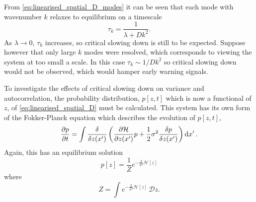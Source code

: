 From \cref{eq:linearised_spatial_D_modes} it can be seen that each mode with wavenumber $k$ relaxes to equilibrium on a timescale
\begin{equation}
  \label{eq:equilirium_timescale}
  \tau_k = \frac{1}{\lambda + Dk^2}.
\end{equation}
As $\lambda \rightarrow 0$, $\tau_k$ increases, so critical slowing down is still to be expected. Suppose however that only large $k$ modes were resolved, which corresponds to
viewing the system at too small a scale. In this case $\tau_k \sim 1/Dk^2$ so critical slowing down would not be observed, which would hamper early
warning signals.

To investigate the effects of critical slowing down on variance and autocorrelation, the probability distribution, $p[z,t]$ which is now a functional of $z$,
of \cref{eq:linearised_spatial_D} must be calculated. This system has its own
form of the Fokker-Planck equation \parencite{Goldenfeld1992} which describes the evolution of $p[z,t]$,
\begin{equation}
  \label{eq:fokker_planck_functional}
  \pdv{p}{t} = \int \fdv{z(x')} \left( \pdv{\mathcal{H}}{z(x')} p + \frac{1}{2}\sigma^2 \fdv{p}{z(x')}\right) \dd{x'}.
\end{equation}
Again, this has an equilibrium solution
\begin{equation}
  \label{eq:fokker_planck_functional_equilibrium}
  p[z] = \frac{1}{Z} e^{-\frac{2}{\sigma^2} \mathcal{H}[z]}
\end{equation}
where
\begin{equation}
  \label{eq:partition_functional}
  Z = \int e^{-\frac{2}{\sigma^2} \mathcal{H}[z]}\,\mathcal{D}z.
\end{equation}

